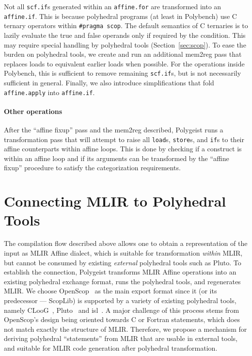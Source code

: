 \documentclass[sigplan]{acmart}
\newcommand{\icode}[1]{{\texttt {#1}}}
\newcommand{\tool}{Polygeist\xspace}
\begin{document}
Not all \icode{scf.if}s generated within an \icode{affine.for} are transformed into an \icode{affine.if}. This is because polyhedral programs (at least in Polybench) use C ternary operators within \icode{\#pragma scop}. The default semantics of C ternaries is to lazily evaluate the true and false operands only if required by the condition. This may require special handling by polyhedral tools (Section~\ref{sec:scop}). To ease the burden on polyhedral tools, we create and run an additional mem2reg pass that replaces loads to equivalent earlier loads when possible. For the operations inside Polybench, this is sufficient to remove remaining \icode{scf.if}s, but is not necessarily sufficient in general. Finally, we also introduce simplifications that fold \icode{affine.apply} into \icode{affine.if}. %

\paragraph{Other operations}
After the ``affine fixup'' pass and the mem2reg described, \tool runs a transformation pass that will attempt to raise all \icode{load}s, \icode{store}s, and \icode{if}s to their affine counterparts within affine loops. This is done by checking if a construct is within an affine loop and if its arguments can be transformed by the ``affine fixup'' procedure to satisfy the categorization requirements.

\section{Connecting MLIR to Polyhedral Tools}

The compilation flow described above allows one to obtain a representation of the input as MLIR Affine dialect, which is suitable for transformation \emph{within} MLIR, but cannot be consumed by existing \emph{external} polyhedral tools such as Pluto.
To establish the connection, \tool transforms MLIR Affine operations into an existing polyhedral exchange format, runs the polyhedral tools, and regenerates MLIR.
We choose OpenScop~\cite{openscop} as the main export format since it (or its predecessor --- ScopLib) is supported by a variety of existing polyhedral tools, namely CLooG~\cite{cloog}, Pluto~\cite{Bondhugula2008Pluto} and isl~\cite{isl}. A major challenge of this process stems from OpenScop's design being oriented towards C or Fortran statements, which does not match exactly the structure of MLIR. Therefore, we propose a mechanism for deriving polyhedral ``statements'' from MLIR that are usable in external tools, and suitable for MLIR code generation after polyhedral transformation.
\end{document}
